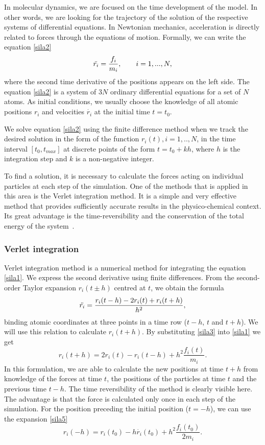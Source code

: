 In molecular dynamics, we are focused on the time development of the model. In other words, we are looking for the trajectory of the solution of the respective systems of differential equations. In Newtonian mechanics, acceleration is directly related to forces through the equations of motion. Formally, we can write the equation \ref{sila2}
\begin{equation}\label{sila2}
	\Ddot{r_i}=\frac{f_i}{m_i}, \qquad i=1,...,N,
\end{equation}
where the second time derivative of the positions appears on the left side. The equation \ref{sila2} is a system of 3$N$ ordinary differential equations for a set of $N$ atoms. As initial conditions, we usually choose the knowledge of all atomic positions $r_i$ and velocities $\dot{r_i}$ at the initial time $t=t_0$. 

We solve equation \ref{sila2} using the finite difference method when we track the desired solution in the form of the function $r_i(t), i=1,..,N$, in the time interval $[t_0,t_{max}]$ at discrete points of the form $t=t_0+kh$, where $h$ is the integration step and $k$ is a non-negative integer.

To find a solution, it is necessary to calculate the forces acting on individual particles at each step of the simulation. One of the methods that is applied in this area is the Verlet integration method. It is a simple and very effective method that provides sufficiently accurate results in the physico-chemical context. Its great advantage is the time-reversibility and the conservation of the total energy of the system~\cite{mdskripta}.

\subsubsection{Verlet integration}
Verlet integration method is a numerical method for integrating the equation \ref{sila1}. We express the second derivative using finite differences. From the second-order Taylor expansion $r_i(t\pm h)$ centred at $t$, we obtain the formula
\begin{equation}\label{sila3}
	\Ddot{r_i}=\frac{r_i(t-h)-2r_i(t)+r_i(t+h)}{h^2},
\end{equation}
binding atomic coordinates at three points in a time row ($t-h$, $t$ and $t+h$). We will use this relation to calculate $r_i(t+h)$. By substituting \ref{sila3} into \ref{sila1} we get 
\begin{equation}\label{sila4}
	r_i(t+h)=2r_i(t)-r_i(t-h)+h^2\frac{f_i(t)}{m_i}.
\end{equation}
In this formulation, we are able to calculate the new positions at time $t+h$ from knowledge of the forces at time $t$, the positions of the particles at time $t$ and the previous time $t-h$. The time reversibility of the method is clearly visible here. The advantage is that the force is calculated only once in each step of the simulation. For the position preceding the initial position ($t=-h$), we can use the expansion \ref{sila5}
\begin{equation}\label{sila5}
	r_i(-h)=r_i(t_0)-h\dot{r_i}(t_0)+h^2\frac{f_i(t_0)}{2m_i}.
\end{equation}

